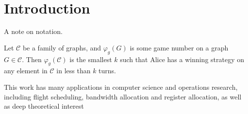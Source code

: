 \chapter{Introduction}
A note on notation.

    Let $\mathcal{C}$ be a family of graphs, and $\varphi_g(G)$ is some game number on a graph $G \in \mathcal{C}$. Then $\varphi_g(\mathcal{C})$ is the smallest $k$ such that Alice has a winning strategy on any element in $\mathcal{C}$ in less than $k$ turns.
    
    
    
    
    
    
    This work has many applications in computer science and operations research, including flight scheduling, bandwidth allocation and register allocation, as well as deep theoretical interest